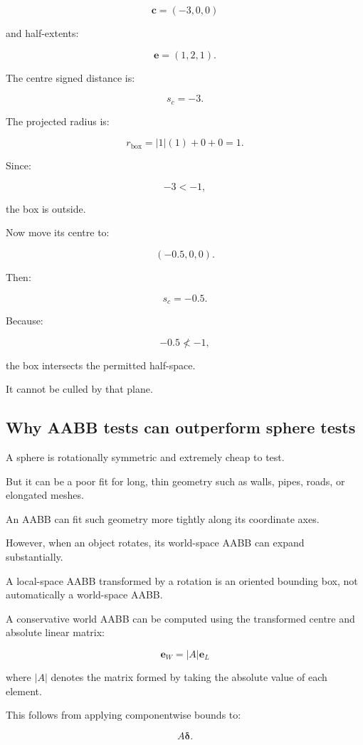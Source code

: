 \[
 \mathbf c=(-3,0,0)
\]

and half-extents:

\[
 \mathbf e=(1,2,1).
\]

The centre signed distance is:

\[
 s_c=-3.
\]

The projected radius is:

\[
 r_{\mathrm{box}}= |1|(1)+0+0=1.
\]

Since:

\[
 -3<-1,
\]

the box is outside.

Now move its centre to:

\[
 (-0.5,0,0).
\]

Then:

\[
 s_c=-0.5.
\]

Because:

\[
 -0.5\not<-1,
\]

the box intersects the permitted half-space.

It cannot be culled by that plane.

\subsection{Why AABB tests can outperform sphere tests}\label{02-foundations-ii-ch034-why-aabb-tests-can-outperform-sphere-tests}

A sphere is rotationally symmetric and extremely cheap to test.

But it can be a poor fit for long, thin geometry such as walls, pipes, roads, or elongated meshes.

An AABB can fit such geometry more tightly along its coordinate axes.

However, when an object rotates, its world-space AABB can expand substantially.

A local-space AABB transformed by a rotation is an oriented bounding box, not automatically a world-space AABB.

A conservative world AABB can be computed using the transformed centre and absolute linear matrix:

\[
 \boxed{ \mathbf e_W=|A|\mathbf e_L }
\]

where \(|A|\) denotes the matrix formed by taking the absolute value of each element.

This follows from applying componentwise bounds to:

\[
 A\boldsymbol\delta.
\]

